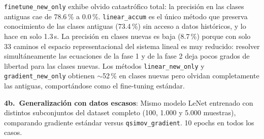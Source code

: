 \begin{table}[htbp]
  \centering
  \caption{Resultados del experimento de olvido catastrófico en CIFAR-10 (GPU, PyTorch).}
  \label{tab:tabla5}
\end{table}

\texttt{finetune\_new\_only} exhibe olvido catastrófico total: la precisión en las clases antiguas
cae de 78.6\,\% a 0.0\,\%. \texttt{linear\_accum} es el único método que preserva conocimiento de
las clases antiguas (73.4\,\%) sin acceso a datos históricos, y lo hace en solo 1.3\,s. La
precisión en clases nuevas es baja (8.7\,\%) porque con solo 33 caminos el espacio representacional
del sistema lineal es muy reducido: resolver simultáneamente las ecuaciones de la fase 1 y de la
fase 2 deja pocos grados de libertad para las clases nuevas. Los métodos
\texttt{linear\_new\_only} y \texttt{gradient\_new\_only} obtienen $\sim$52\,\% en clases nuevas
pero olvidan completamente las antiguas, comportándose como el fine-tuning estándar.

\textbf{4b.~Generalización con datos escasos}: Mismo modelo LeNet entrenado con distintos
subconjuntos del dataset completo (100, 1.000 y 5.000 muestras), comparando gradiente estándar
versus \texttt{qsimov\_gradient}. 10 epochs en todos los casos.

